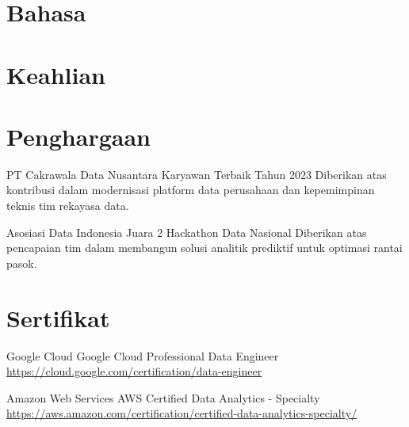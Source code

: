 \documentclass[a4paper, serif, 10pt]{moderncv}
\begin{document}
\section{Bahasa}

\section{Keahlian}

\section{Penghargaan}

        {PT Cakrawala Data Nusantara}
        {Karyawan Terbaik Tahun 2023}
        {}
        {}
        {Diberikan atas kontribusi dalam modernisasi platform data perusahaan dan kepemimpinan teknis tim rekayasa data.}

        {Asosiasi Data Indonesia}
        {Juara 2 Hackathon Data Nasional}
        {}
        {}
        {Diberikan atas pencapaian tim dalam membangun solusi analitik prediktif untuk optimasi rantai pasok.}
\section{Sertifikat}

        {Google Cloud}
        {Google Cloud Professional Data Engineer}
        {\url{https://cloud.google.com/certification/data-engineer}}
        {}
        {}

        {Amazon Web Services}
        {AWS Certified Data Analytics - Specialty}
        {\url{https://aws.amazon.com/certification/certified-data-analytics-specialty/}}
        {}
        {}
\end{document}
